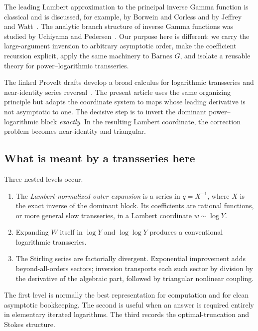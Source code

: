 \documentclass[11pt,a4paper]{article}
\numberwithin{equation}{section}
\theoremstyle{definition}
\theoremstyle{remark}
\begin{document}
The leading Lambert approximation to the principal inverse Gamma function
is classical and is discussed, for example, by Borwein and Corless and by
Jeffrey and Watt~\cite{BorweinCorless,JeffreyWatt}.  The analytic branch
structure of inverse Gamma functions was studied by Uchiyama and
Pedersen~\cite{Uchiyama,Pedersen}.  Our purpose here is different: we carry
the large-argument inversion to arbitrary asymptotic order, make the
coefficient recursion explicit, apply the same machinery to Barnes \(G\),
and isolate a reusable theory for power--logarithmic transseries.

The linked ProveIt drafts develop a broad calculus for logarithmic
transseries and near-identity series reversal~\cite{ProveItTransseries}.
The present article uses the same organizing principle but adapts the
coordinate system to maps whose leading derivative is not asymptotic to
one.  The decisive step is to invert the dominant power--logarithmic block
\emph{exactly}.  In the resulting Lambert coordinate, the correction
problem becomes near-identity and triangular.

\subsection{What is meant by a transseries here}

Three nested levels occur.

\begin{enumerate}
\item The \emph{Lambert-normalized outer expansion} is a series in
      \(q=X^{-1}\), where \(X\) is the exact inverse of the dominant block.
      Its coefficients are rational functions, or more general slow
      transseries, in a Lambert coordinate \(w\sim\log Y\).
\item Expanding \(W\) itself in \(\log Y\) and \(\log\log Y\) produces a
      conventional logarithmic transseries.
\item The Stirling series are factorially divergent.  Exponential
      improvement adds beyond-all-orders sectors; inversion transports
      each such sector by division by the derivative of the algebraic
      part, followed by triangular nonlinear coupling.
\end{enumerate}

The first level is normally the best representation for computation and
for clean asymptotic bookkeeping.  The second is useful when an answer is
required entirely in elementary iterated logarithms.  The third records
the optimal-truncation and Stokes structure.
\end{document}
